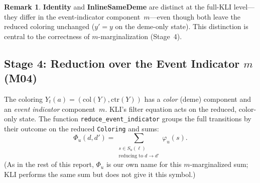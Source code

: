 \documentclass[11pt,leqno]{article}
\newcommand{\code}[1]{\texttt{#1}}
\theoremstyle{plain}
\theoremstyle{definition}
\newtheorem{remark}[theorem]{Remark}
\begin{document}
\begin{remark}
\textbf{Identity} and \textbf{InlineSameDeme} are distinct at the full-KLI
level---they differ in the event-indicator component~$m$---even though both
leave the reduced coloring unchanged ($y' = y$ on the deme-only state).
This distinction is central to the correctness of $m$-marginalization
(Stage~4).
\end{remark}

\subsection{Stage 4: Reduction over the Event Indicator $m$ (M04)}

The coloring $Y_t(a) = (\mathrm{col}(Y), \mathrm{ctr}(Y))$ has a
\emph{color} (deme) component and an \emph{event indicator}
component~$m$.  KLI's filter equation acts on the reduced, color-only
state.  The function \code{reduce\_event\_indicator} groups the full
transitions by their outcome on the reduced \code{Coloring} and sums:
\begin{equation}\label{eq:Phi}
  \Phi_u(d, d') = \sum_{\substack{s \in S_u(\ell) \\
    \text{reducing to } d \to d'}} \varphi_u(s).
\end{equation}
(As in the rest of this report, $\Phi_u$ is our own name for this
$m$-marginalized sum; KLI performs the same sum but does not give it this
symbol.)
\end{document}

